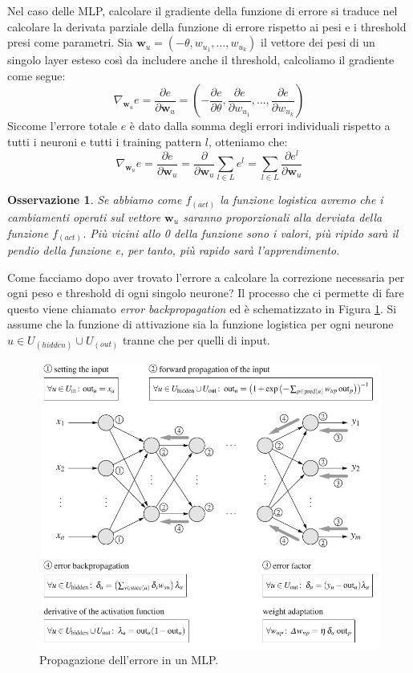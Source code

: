 \documentclass[10pt,a4paper]{article}
\newtheorem{remark}{Osservazione}
\newcommand{\ww}{\mathbf{w}}
\begin{document}
Nel caso delle MLP, calcolare il gradiente della funzione di errore si traduce nel calcolare la derivata parziale della funzione di errore rispetto ai pesi e i threshold presi come parametri. Sia $\ww_u = (-\theta,w_{u_1},\dots,w_{u_k})$ il vettore dei pesi di un singolo layer esteso così da includere anche il threshold, calcoliamo il gradiente come segue:
$$
\nabla_{\ww_u} e = \frac{\partial e}{\partial \ww_u} = (-\frac{\partial e}{\partial \theta}, \frac{\partial e}{\partial w_{u_1}},\dots,\frac{\partial e}{\partial w_{u_k}})
$$
Siccome l'errore totale $e$ è dato dalla somma degli errori individuali rispetto a tutti i neuroni e tutti i training pattern $l$, otteniamo che:
$$
\nabla_{\ww_u} e = \frac{\partial e}{\partial \ww_u} = \frac{\partial}{\partial \ww_u} \sum_{l \in L} e^l = \sum_{l \in L} \frac{\partial e^l}{\partial \ww_u}
$$
\begin{remark}
\emph{Se abbiamo come $f_{(act)}$ la funzione logistica avremo che i cambiamenti operati sul vettore $\ww_u$ saranno proporzionali alla derviata della funzione $f_{(act)}$. Più vicini allo 0 della funzione sono i valori, più ripido sarà il pendio della funzione e, per tanto, più rapido sarà l'apprendimento.}
\end{remark}

Come facciamo dopo aver trovato l'errore a calcolare la correzione necessaria per ogni peso e threshold di ogni singolo neurone? Il processo che ci permette di fare questo viene chiamato \emph{error backpropagation} ed è schematizzato in Figura \ref{fig:14}. Si assume che la funzione di attivazione sia la funzione logistica per ogni neurone $u \in U_{(hidden)} \cup U_{(out)}$ tranne che per quelli di input.

\begin{figure}
\centering
\includegraphics[scale=0.4]{img/backpropagation.png}
\caption{Propagazione dell'errore in un MLP.}
\label{fig:14}
\end{figure}
\end{document}
